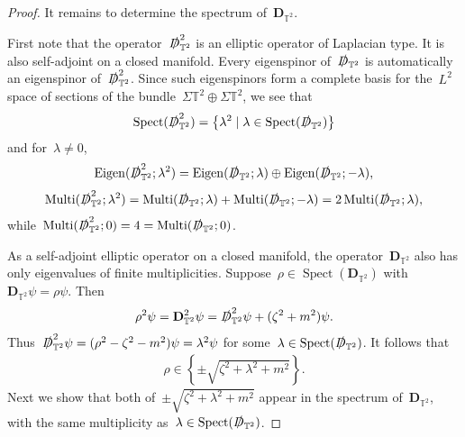 \documentclass[10pt,a4paper]{amsart}
\newcommand{\T}{\mathbb{T}}
\newcommand{\D}{\slashed{D}}
\newcommand{\pD}{\mathbf{D}}
\newcommand{\braces}[1]{\left\{#1\right\}} %
\DeclareMathOperator{\Eigen}{Eigen}
\DeclareMathOperator{\Mtp}{Multi} %
\DeclareMathOperator{\Spect}{Spect}
\begin{document}
\begin{proof}
    It remains to determine the spectrum of~$\pD_{\T^2}$.

    First note that the operator~$\D_{\T^2}^2$ is an elliptic operator of Laplacian type. 
    It is also self-adjoint on a closed manifold. 
    Every eigenspinor of~$\D_{\T^2}$ is automatically an eigenspinor of~$\D_{\T^2}^2$.
    Since such eigenspinors form a complete basis for the~$L^2$ space of sections of the bundle~$\Sigma\T^2\oplus \Sigma\T^2$, we see that
    \begin{align}
        \Spect(\D_{\T^2}^2)=\braces{\lambda^2 \mid \lambda\in\Spect(\D_{\T^2})}
    \end{align}
    and for~$\lambda\neq 0$, 
    \begin{align}\label{eq:Eigen-lambda2}
        \Eigen(\D_{\T^2}^2;\lambda^2)
        =\Eigen(\D_{\T^2};\lambda)
        \oplus
        \Eigen(\D_{\T^2};-\lambda),
    \end{align}
    \begin{align}
        \Mtp(\D_{\T^2}^2;\lambda^2)
        = \Mtp(\D_{\T^2};\lambda) 
        + \Mtp(\D_{\T^2};-\lambda)
        =2\Mtp(\D_{\T^2};\lambda), 
    \end{align}
    while~$\Mtp(\D_{\T^2}^2;0)=4=\Mtp(\D_{\T^2};0)$.

    As a self-adjoint elliptic operator on a closed manifold, the operator~$\pD_{\T^2}$ also has only eigenvalues of finite multiplicities. 
    Suppose~$\rho\in\Spect(\pD_{\T^2})$ with~$\pD_{\T^2}\psi=\rho\psi$.
    Then 
    \begin{align}
        \rho^2\psi=\pD_{\T^2}^2\psi 
        = \D_{\T^2}^2\psi + (\zeta^2+m^2)\psi. 
    \end{align}
    Thus~$\D_{\T^2}^2\psi= (\rho^2-\zeta^2-m^2)\psi=\lambda^2\psi$ for some~$\lambda\in\Spect(\D_{\T^2})$. 
    It follows that
    \begin{align}
        \rho\in \braces{\pm \sqrt{\zeta^2+\lambda^2+m^2}}. 
    \end{align}
    Next we show that both of~$\pm \sqrt{\zeta^2+\lambda^2+m^2} $ appear in the spectrum of~$\pD_{\T^2}$, with the same multiplicity as~$\lambda\in\Spect(\D_{\T^2})$.


\end{proof}
\end{document}
